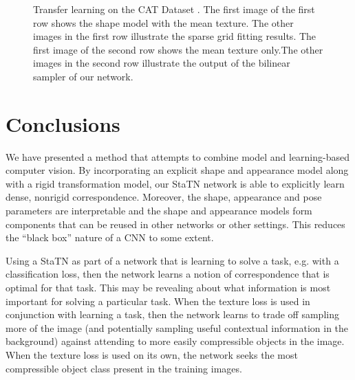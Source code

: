 \documentclass[runningheads]{llncs}
\begin{document}
\begin{figure}[!t] \centering
\noindent{}
\caption{Transfer learning on the CAT Dataset \cite{zhang2008cat}. The first image of the first row shows the shape model with the mean texture. The other images in the first row illustrate the sparse grid fitting results. The first image of the second row shows the mean texture only.The other images in the second row illustrate the output of the bilinear sampler of our network.}
\label{fig:cat}
\end{figure}

\section{Conclusions}

We have presented a method that attempts to combine model and learning-based computer vision. By incorporating an explicit shape and appearance model along with a rigid transformation model, our StaTN network is able to explicitly learn dense, nonrigid correspondence. Moreover, the shape, appearance and pose parameters are interpretable and the shape and appearance models form components that can be reused in other networks or other settings. This reduces the ``black box'' nature of a CNN to some extent.

Using a StaTN as part of a network that is learning to solve a task, e.g. with a classification loss, then the network learns a notion of correspondence that is optimal for that task. This may be revealing about what information is most important for solving a particular task. When the texture loss is used in conjunction with learning a task, then the network learns to trade off sampling more of the image (and potentially sampling useful contextual information in the background) against attending to more easily compressible objects in the image. When the texture loss is used on its own, the network seeks the most compressible object class present in the training images.
\end{document}
